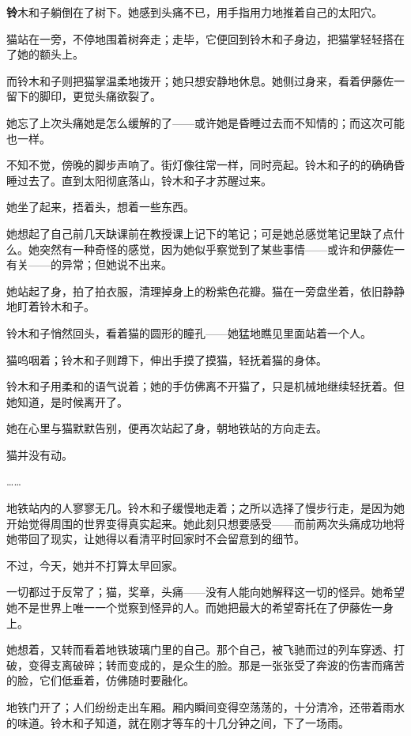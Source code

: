 
\AddSymbolsC
\pagecolor{purple!10!gray}
\color{white}
\quad\quad \lettrine[,lraise=0.2,lhang=0.5]{\textbf{铃}}{木}和子躺倒在了树下。她感到头痛不已，用手指用力地推着自己的太阳穴。

猫站在一旁，不停地围着树奔走；走毕，它便回到铃木和子身边，把猫掌轻轻搭在了她的额头上。

而铃木和子则把猫掌温柔地拨开；她只想安静地休息。她侧过身来，看着伊藤佐一留下的脚印，更觉头痛欲裂了。

她忘了上次头痛她是怎么缓解的了——或许她是昏睡过去而不知情的；而这次可能也一样。

不知不觉，傍晚的脚步声响了。街灯像往常一样，同时亮起。铃木和子的的确确昏睡过去了。直到太阳彻底落山，铃木和子才苏醒过来。

她坐了起来，捂着头，想着一些东西。

她想起了自己前几天缺课前在教授课上记下的笔记；可是她总感觉笔记里缺了点什么。她突然有一种奇怪的感觉，因为她似乎察觉到了某些事情——或许和伊藤佐一有关——的异常；但她说不出来。

她站起了身，拍了拍衣服，清理掉身上的粉紫色花瓣。猫在一旁盘坐着，依旧静静地盯着铃木和子。

铃木和子悄然回头，看着猫的圆形的瞳孔——她猛地瞧见里面站着一个人。

猫呜咽着；铃木和子则蹲下，伸出手摸了摸猫，轻抚着猫的身体。


铃木和子用柔和的语气说着；她的手仿佛离不开猫了，只是机械地继续轻抚着。但她知道，是时候离开了。

她在心里与猫默默告别，便再次站起了身，朝地铁站的方向走去。

猫并没有动。

……

地铁站内的人寥寥无几。铃木和子缓慢地走着；之所以选择了慢步行走，是因为她开始觉得周围的世界变得真实起来。她此刻只想要感受——而前两次头痛成功地将她带回了现实，让她得以看清平时回家时不会留意到的细节。

不过，今天，她并不打算太早回家。

一切都过于反常了；猫，奖章，头痛——没有人能向她解释这一切的怪异。她希望她不是世界上唯一一个觉察到怪异的人。而她把最大的希望寄托在了伊藤佐一身上。

她想着，又转而看着地铁玻璃门里的自己。那个自己，被飞驰而过的列车穿透、打破，变得支离破碎；转而变成的，是众生的脸。那是一张张受了奔波的伤害而痛苦的脸，它们低垂着，仿佛随时要融化。

地铁门开了；人们纷纷走出车厢。厢内瞬间变得空荡荡的，十分清冷，还带着雨水的味道。铃木和子知道，就在刚才等车的十几分钟之间，下了一场雨。

